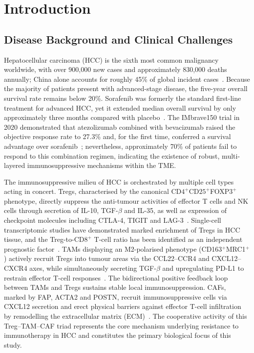 \documentclass[12pt, a4paper]{article}
\begin{document}
\section{Introduction}

\subsection{Disease Background and Clinical Challenges}

Hepatocellular carcinoma (HCC) is the sixth most common malignancy worldwide, with over 900,000 new cases and approximately 830,000 deaths annually; China alone accounts for roughly 45\% of global incident cases~\citep{llovet2021hepatocellular,chen2016liver}. Because the majority of patients present with advanced-stage disease, the five-year overall survival rate remains below 20\%. Sorafenib was formerly the standard first-line treatment for advanced HCC, yet it extended median overall survival by only approximately three months compared with placebo~\citep{llovet2008sorafenib}. The IMbrave150 trial in 2020 demonstrated that atezolizumab combined with bevacizumab raised the objective response rate to 27.3\% and, for the first time, conferred a survival advantage over sorafenib~\citep{finn2020atezolizumab}; nevertheless, approximately 70\% of patients fail to respond to this combination regimen, indicating the existence of robust, multi-layered immunosuppressive mechanisms within the TME.

The immunosuppressive milieu of HCC is orchestrated by multiple cell types acting in concert. Tregs, characterised by the canonical CD$4^+$CD$25^+$FOXP$3^+$ phenotype, directly suppress the anti-tumour activities of effector T cells and NK cells through secretion of IL-10, TGF-$\beta$ and IL-35, as well as expression of checkpoint molecules including CTLA-4, TIGIT and LAG-3~\citep{sakaguchi2020regulatory}. Single-cell transcriptomic studies have demonstrated marked enrichment of Tregs in HCC tissue, and the Treg-to-CD$8^+$ T-cell ratio has been identified as an independent prognostic factor~\citep{zheng2017landscape}. TAMs displaying an M2-polarised phenotype (CD163$^+$MRC1$^+$) actively recruit Tregs into tumour areas via the CCL22--CCR4 and CXCL12--CXCR4 axes, while simultaneously secreting TGF-$\beta$ and upregulating PD-L1 to restrain effector T-cell responses~\citep{noy2014tumor}. The bidirectional positive feedback loop between TAMs and Tregs sustains stable local immunosuppression. CAFs, marked by FAP, ACTA2 and POSTN, recruit immunosuppressive cells via CXCL12 secretion and erect physical barriers against effector T-cell infiltration by remodelling the extracellular matrix (ECM)~\citep{kalluri2016biology,mariathasan2018tgfb}. The cooperative activity of this Treg--TAM--CAF triad represents the core mechanism underlying resistance to immunotherapy in HCC and constitutes the primary biological focus of this study.
\end{document}
